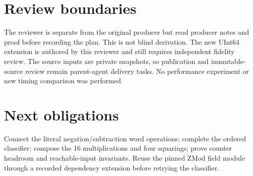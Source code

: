 \documentclass[11pt]{article}
\begin{document}
\section*{Review boundaries}
The reviewer is separate from the original producer but read producer notes and proof before recording the plan. This is not blind derivation. The new UInt64 extension is authored by this reviewer and still requires independent fidelity review. The source inputs are private snapshots, so publication and immutable-source review remain parent-agent delivery tasks. No performance experiment or new timing comparison was performed.
\section*{Next obligations}
Connect the literal negation/subtraction word operations; complete the ordered classifier; compose the 16 multiplications and four squarings; prove counter headroom and reachable-input invariants. Reuse the pinned ZMod field module through a recorded dependency extension before retrying the classifier.
\end{document}
